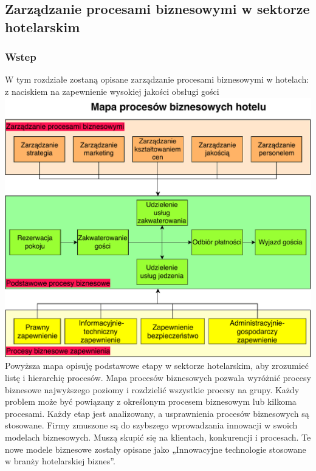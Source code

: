 \documentclass[a4paper, 12pt]{article}
\begin{document}
\subsection{Zarządzanie procesami biznesowymi w sektorze hotelarskim}
\subsubsection{Wstep}
\hspace*{1 cm} W tym rozdziałe zostaną opisane zarządzanie procesami biznesowymi w hotelach: z naciskiem na zapewnienie wysokiej jakości obsługi gości\newline
\includegraphics[scale=0.9]{hotel} \newline
Powyższa mapa opisuję podstawowe etapy w sektorze hotelarskim, aby zrozumieć listę i hierarchię procesów. Mapa procesów biznesowych pozwala wyróżnić procesy biznesowe najwyższego poziomy i rozdzielić wszystkie procesy na grupy. Każdy problem może być powiązany z określonym procesem biznesowym lub kilkoma procesami.\newline
Każdy etap jest analizowany, a usprawnienia procesów biznesowych są stosowane.\newline
\hspace*{1cm}Firmy zmuszone są do szybszego wprowadzania innowacji w swoich modelach biznesowych. Muszą skupić się na klientach, konkurencji i procesach. Te nowe modele biznesowe zostały opisane jako „Innowacyjne technologie stosowane w branży hotelarskiej biznes”.
\end{document}
